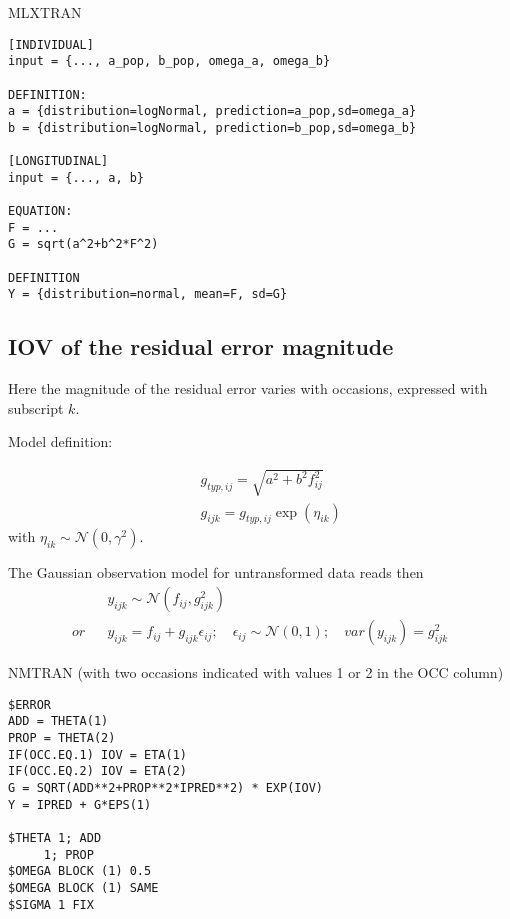 \begin{lrbox}{\lstbox}\begin{minipage}{16cm}
MLXTRAN
\begin{lstlisting}[frame=single,language=MLX]
[INDIVIDUAL]
input = {..., a_pop, b_pop, omega_a, omega_b}

DEFINITION:
a = {distribution=logNormal, prediction=a_pop,sd=omega_a}
b = {distribution=logNormal, prediction=b_pop,sd=omega_b}

[LONGITUDINAL]
input = {..., a, b}

EQUATION:
F = ...
G = sqrt(a^2+b^2*F^2)

DEFINITION
Y = {distribution=normal, mean=F, sd=G}
\end{lstlisting}   
\end{minipage}\end{lrbox}
\usebox\lstbox


\subsection{IOV of the residual error magnitude}

Here the magnitude of the residual error varies with occasions, expressed with subscript $k$.

\bigskip
Model definition:

\begin{eqnarray}
&&g_{typ,ij} = \sqrt{a^2 + b^2 f_{ij}^2} \nonumber \\
&&g_{ijk} = g_{typ,ij} \exp(\eta_{ik}) \nonumber 
\end{eqnarray}
with $\eta_{ik} \sim \mathcal{N}(0,\gamma^2)$. 

\bigskip

The Gaussian observation model for untransformed data reads then
\begin{eqnarray}
&& y_{ijk} \sim \mathcal{N}(f_{ij},g_{ijk}^2) \nonumber \\
or && y_{ijk} = f_{ij} + g_{ijk} \epsilon_{ij}; \quad \epsilon_{ij} \sim \mathcal{N}(0,1); \quad var(y_{ijk}) = g^2_{ijk}	 \nonumber
\end{eqnarray}

\bigskip 
\begin{lrbox}{\lstbox}\begin{minipage}{16cm}
NMTRAN (with two occasions indicated with values 1 or 2 in the OCC column)
\begin{lstlisting}[frame=single,language=NM]
$ERROR
ADD = THETA(1)
PROP = THETA(2)
IF(OCC.EQ.1) IOV = ETA(1)
IF(OCC.EQ.2) IOV = ETA(2)
G = SQRT(ADD**2+PROP**2*IPRED**2) * EXP(IOV)
Y = IPRED + G*EPS(1)

$THETA 1; ADD
	 1; PROP
$OMEGA BLOCK (1) 0.5
$OMEGA BLOCK (1) SAME
$SIGMA 1 FIX
\end{lstlisting}   
\end{minipage}\end{lrbox}
\usebox\lstbox

